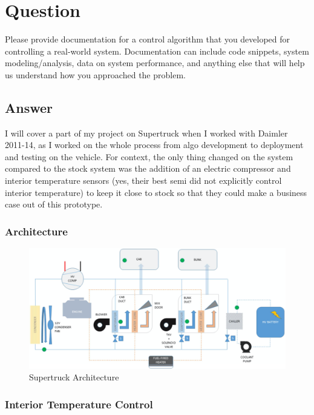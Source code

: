 \section{Question}
Please provide documentation for a control algorithm that you developed for controlling
a real-world system. Documentation can include code snippets, system
modeling/analysis, data on system performance, and anything else that will help us
understand how you approached the problem.

\subsection *{Answer}
I will cover a part of my project on Supertruck when I worked with Daimler 2011-14, as I worked on the whole process from algo development to deployment and testing on the vehicle. For context, the only thing changed on the system compared to the stock system was the addition of an electric compressor and interior temperature sensors (yes, their best semi did not explicitly control interior temperature) to keep it close to stock so that they could make a business case out of this prototype.

\subsubsection * {Architecture}

\begin{figure}[h!]
  \includegraphics[width=\textwidth]{supertruck_arch}
  \caption{Supertruck Architecture}
\end{figure}

\subsubsection * {Interior Temperature Control}

